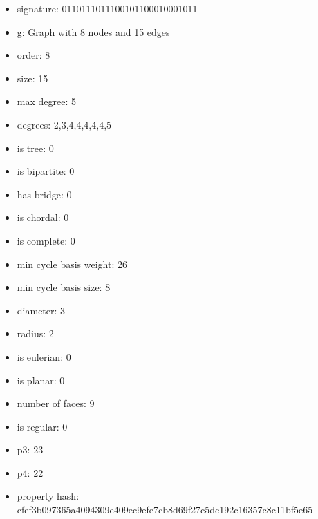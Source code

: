 \begin{itemize}
\item signature: 0110111011100101100010001011
\item g: Graph with 8 nodes and 15 edges
\item order: 8
\item size: 15
\item max degree: 5
\item degrees: 2,3,4,4,4,4,4,5
\item is tree: 0
\item is bipartite: 0
\item has bridge: 0
\item is chordal: 0
\item is complete: 0
\item min cycle basis weight: 26
\item min cycle basis size: 8
\item diameter: 3
\item radius: 2
\item is eulerian: 0
\item is planar: 0
\item number of faces: 9
\item is regular: 0
\item p3: 23
\item p4: 22
\item property hash: cfef3b097365a4094309e409ec9efe7cb8d69f27c5dc192c16357c8c11bf5e65
\end{itemize}
\newpage
\begin{figure}
\end{figure}
